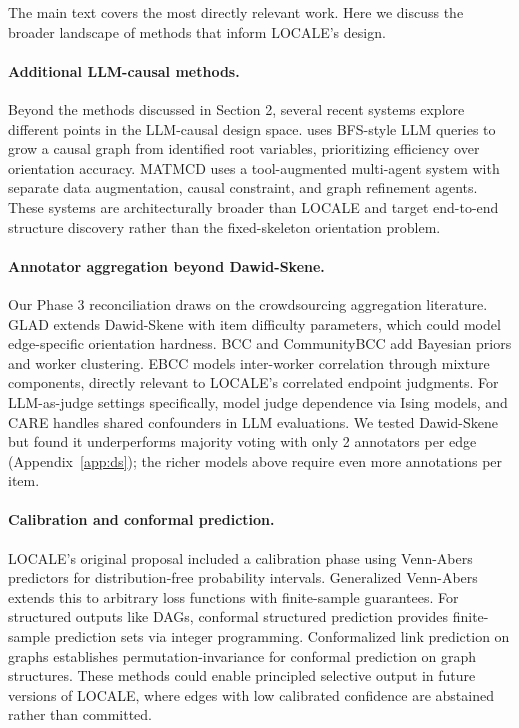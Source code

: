 \documentclass{article} %
\begin{document}
The main text covers the most directly relevant work. Here we discuss the broader landscape of methods that inform LOCALE's design.

\paragraph{Additional LLM-causal methods.}
Beyond the methods discussed in Section 2, several recent systems explore different points in the LLM-causal design space. \citet{jiralerspong2024efficient} uses BFS-style LLM queries to grow a causal graph from identified root variables, prioritizing efficiency over orientation accuracy. MATMCD \citep{shen2025matmcd} uses a tool-augmented multi-agent system with separate data augmentation, causal constraint, and graph refinement agents. These systems are architecturally broader than LOCALE and target end-to-end structure discovery rather than the fixed-skeleton orientation problem.

\paragraph{Annotator aggregation beyond Dawid-Skene.}
Our Phase 3 reconciliation draws on the crowdsourcing aggregation literature. GLAD \citep{whitehill2009glad} extends Dawid-Skene with item difficulty parameters, which could model edge-specific orientation hardness. BCC \citep{kim2012bcc} and CommunityBCC \citep{venanzi2014communitybcc} add Bayesian priors and worker clustering. EBCC \citep{li2019ebcc} models inter-worker correlation through mixture components, directly relevant to LOCALE's correlated endpoint judgments. For LLM-as-judge settings specifically, \citet{balasubramanian2026ising} model judge dependence via Ising models, and CARE \citep{zhao2026care} handles shared confounders in LLM evaluations. We tested Dawid-Skene but found it underperforms majority voting with only 2 annotators per edge (Appendix~\ref{app:ds}); the richer models above require even more annotations per item.

\paragraph{Calibration and conformal prediction.}
LOCALE's original proposal included a calibration phase using Venn-Abers predictors for distribution-free probability intervals. Generalized Venn-Abers \citep{vanderlaan2025gva} extends this to arbitrary loss functions with finite-sample guarantees. For structured outputs like DAGs, conformal structured prediction \citep{zhang2025conformal} provides finite-sample prediction sets via integer programming. Conformalized link prediction on graphs \citep{zhao2024clp} establishes permutation-invariance for conformal prediction on graph structures. These methods could enable principled selective output in future versions of LOCALE, where edges with low calibrated confidence are abstained rather than committed.
\end{document}
